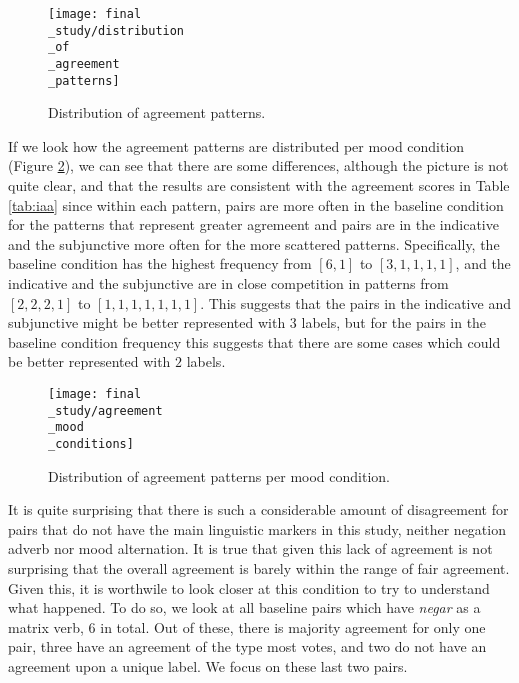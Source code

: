 \begin{figure}
\parbox{15cm}{\texttt{[image: final\\\_study/distribution\\\_of\\\_agreement\\\_patterns]}
\caption{Distribution of agreement patterns.}}\label{fig:pat}
\qquad
\end{figure}

If we look how the agreement patterns are distributed per mood condition (Figure \ref{fig:moodpat}), we can see that there are some differences, although the picture is not quite clear, and that the results are consistent with the agreement scores in Table \ref{tab:iaa} since within each pattern, pairs are more often in the baseline condition for the patterns that represent greater agremeent and pairs are in the indicative and the subjunctive more often for the more scattered patterns. Specifically, the baseline condition has the highest frequency from $[6,1]$ to $[3,1,1,1,1]$, and the indicative and the subjunctive are in close competition in patterns from $[2,2,2,1]$ to $[1,1,1,1,1,1,1]$. This suggests that the pairs in the indicative and subjunctive might be better represented with 3 labels, but for the pairs in the baseline condition frequency this suggests that there are some cases which could be better represented with $2$ labels.\\

\begin{figure}
\parbox{15cm}{\texttt{[image: final\\\_study/agreement\\\_mood\\\_conditions]}
\caption{Distribution of agreement patterns per mood condition.}\label{fig:moodpat}}
\qquad
\end{figure}

It is quite surprising that there is such a considerable amount of disagreement for pairs that do not have the main linguistic markers in this study, neither negation adverb nor mood alternation. It is true that given this lack of agreement is not surprising that the overall agreement is barely within the range of fair agreement. Given this, it is worthwile to look closer at this condition to try to understand what happened. To do so, we look at all baseline pairs which have \textit{negar} as a matrix verb, $6$ in total. Out of these, there is majority agreement for only one pair, three have an agreement of the type most votes, and two do not have an agreement upon a unique label. We focus on these last two pairs.\\


